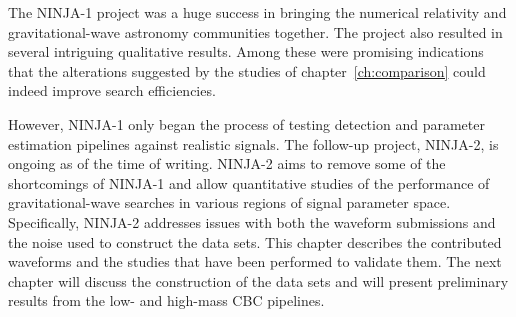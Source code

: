 The NINJA-1 project was a huge success in bringing the numerical
relativity and gravitational-wave astronomy communities together.  The
project also resulted in several intriguing qualitative results.
Among these were promising indications that the alterations suggested 
by the studies of chapter~\ref{ch:comparison} could indeed improve
search efficiencies.

However, NINJA-1 only began the process of testing detection and
parameter estimation pipelines against realistic signals.  The
follow-up project, NINJA-2, is ongoing as of the time of writing.
NINJA-2 aims to remove some of the shortcomings of NINJA-1 and allow
quantitative studies of the performance of gravitational-wave searches
in various regions of signal parameter space.  Specifically, NINJA-2
addresses issues with both the waveform submissions and the noise used
to construct the data sets.  This chapter describes the contributed
waveforms and the studies that have been performed to validate them.
The next chapter will discuss the construction of the data sets and
will present preliminary results from the low- and high-mass CBC
pipelines.

